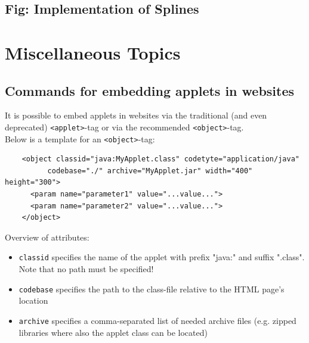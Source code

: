 \documentclass[a4paper,12pt]{book}
\begin{document}
\begin{appendix}
\section{Fig: Implementation of Splines}

\clearpage

\clearpage

\chapter{Miscellaneous Topics}
\section{Commands for embedding applets in websites}
  It is possible to embed applets in websites via the traditional (and even deprecated)
  \verb|<applet>|-tag or via the recommended \verb|<object>|-tag.\\
  Below is a template for an \verb|<object>|-tag:\\
  \begin{verbatim}
    <object classid="java:MyApplet.class" codetyte="application/java"
          codebase="./" archive="MyApplet.jar" width="400" height="300">
      <param name="parameter1" value="...value...">
      <param name="parameter2" value="...value...">
    </object>
  \end{verbatim}
  Overview of attributes:
  \begin{itemize}
  \item \verb|classid| specifies the name of the applet with prefix "java:" and suffix ".class". Note that no path must be specified!
  \item \verb|codebase| specifies the path to the class-file relative to the HTML page's location
  \item \verb|archive| specifies a comma-separated list of needed archive files (e.g. zipped 
  libraries where also the applet class can be located)
  \end{itemize}


\end{appendix}
\end{document}
